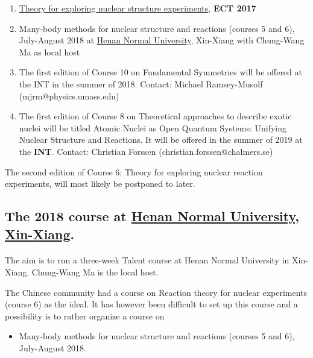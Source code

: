 \documentclass[%
oneside,                 %
final,                   %
10pt]{article}
\begin{document}
\begin{enumerate}
\item \href{{https://github.com/NuclearTalent/NuclearStructure}}{Theory for exploring nuclear structure experiments}, \textbf{ECT 2017}

\item Many-body methods for nuclear structure and reactions (courses 5 and 6), July-August 2018 at \href{{http://www.htu.cn/english/}}{Henan Normal University}, Xin-Xiang with Chung-Wang Ma as local host

\item The first edition of Course 10 on Fundamental Symmetries will be offered at the INT in the summer of 2018. Contact: Michael Ramsey-Musolf (mjrm@physics.umass.edu)

\item The first edition of Course 8 on Theoretical approaches to describe exotic nuclei will be titled Atomic Nuclei as Open Quantum Systems: Unifying Nuclear Structure and Reactions. It will be offered in the summer of 2019 at the \textbf{INT}. Contact: Christian Forssen (christian.forssen@chalmers.se)
\end{enumerate}

\noindent
The second edition of Course 6: Theory for exploring nuclear reaction experiments, will most likely be postponed to later.





\subsection{The 2018 course at \href{{http://www.htu.cn/english/}}{Henan Normal University, Xin-Xiang}.}

\paragraph{}
The aim is to run a three-week Talent course at Henan Normal University in Xin-Xiang. Chung-Wang Ma is the local host. 

The Chinese community had a course on Reaction theory for nuclear experiments (course 6) as the ideal. It has however been difficult to set up this course and a possibility is to rather organize a course on

\begin{itemize}
\item Many-body methods for nuclear structure and reactions (courses 5 and 6), July-August 2018.
\end{itemize}
\end{document}
